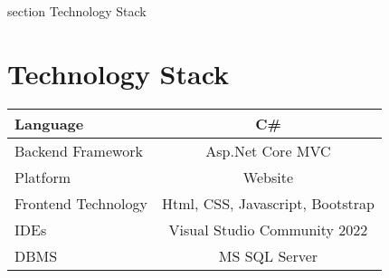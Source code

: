 

 {section} {Technology Stack}
\section*{Technology Stack}
\label{Technology Stack}

\begin{table}[H]
\begin{tabular}{|l|c|}
\hline
Language            & C\#                              \\ \hline
Backend Framework   & Asp.Net Core MVC                 \\ \hline
Platform            & Website                          \\ \hline
Frontend Technology & Html, CSS, Javascript, Bootstrap \\ \hline
IDEs                & Visual Studio Community 2022     \\ \hline
DBMS                & MS SQL Server                    \\ \hline
\end{tabular}
\end{table}

\clearpage